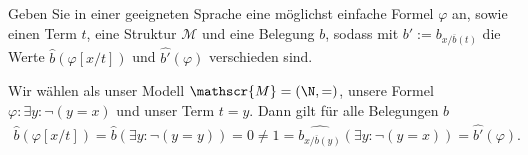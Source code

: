 
\begin{exercise}[68]

Geben Sie in einer geeigneten Sprache eine möglichst einfache Formel $\varphi$
an, sowie einen Term $t$, eine Struktur $\mathscr{M}$ und eine Belegung $b$,
sodass mit $b' := b_{x/\overline{b}(t)}$ die Werte $\hat{b}(\varphi[x/t])$
und $\hat{b'}(\varphi)$ verschieden sind.

\end{exercise}


\begin{solution}

Wir wählen als unser Modell $\mathscr{M} = (\N, =)$, unsere Formel
$\varphi: \exists y: \neg (y = x)$ und unser Term $t = y$.
Dann gilt für alle Belegungen $b$
\begin{align*}
  \hat{b}(\varphi[x/t]) = \hat{b}(\exists y: \neg (y = y))
  = 0 \neq 1 = \widehat{b_{x/\overline{b}(y)}}(\exists y: \neg (y = x)) = \hat{b'}(\varphi).
\end{align*}

\end{solution}


